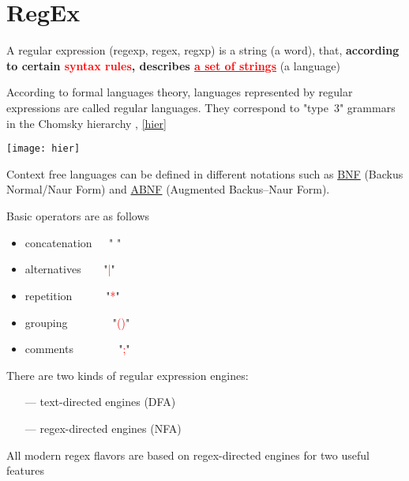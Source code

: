\section{RegEx}

\begin{multicols*}{2}\setlength{\parindent}{0pt}

A regular expression (\textcolor{o}{regexp}, \textcolor{r}{regex}, \textcolor{b}{regxp}) is a string (a word), that, \textbf{according to certain \textcolor{red}{syntax rules}, describes \textcolor{red}{\underline{a set of strings}}} (a language)

According to formal languages theory, languages represented by regular expressions are called regular languages. They correspond to "type~3" grammars in the Chomsky hierarchy \cite{wiki1}, \autoref{hier}

\begin{Figure}
 \centering
 \texttt{[image: hier]}
 \label{hier}
\end{Figure}


Context free languages can be defined in different notations such as \href{https://en.wikipedia.org/wiki/Backus–Naur_form}{BNF} (Backus Normal/Naur Form) and \href{https://en.wikipedia.org/wiki/Augmented_Backus–Naur_form}{ABNF} (Augmented Backus–Naur Form).

Basic operators are as follows
\begin{itemize}
    \item concatenation\verb|   |" "
    \item alternatives\verb|    |"\textcolor{red}{|}"
    \item repetition\verb|      |"\textcolor{red}{*}"
    \item grouping\verb|        |"\textcolor{red}{()}"
    \item comments\verb|        |"\textcolor{red}{;}"
\end{itemize}

There are two kinds of regular expression engines:

\begin{itemize}
    \item[---] \textcolor{r}{text-directed} engines (DFA)
    \item[---] \textcolor{r}{regex-directed} engines (NFA)
\end{itemize}

All modern regex flavors are based on \textcolor{r}{regex-directed} engines for two useful features \cite{master}


\end{multicols*}

